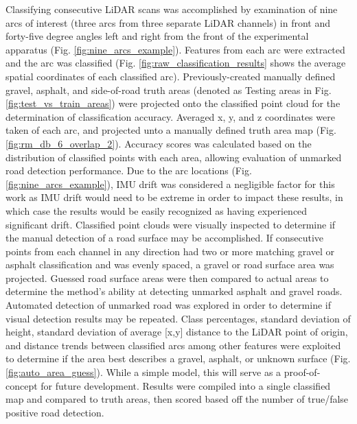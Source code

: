 \documentclass[journal,onecolumn]{IEEEtran}
\begin{document}
			{Classifying consecutive LiDAR scans was accomplished by examination of nine arcs of interest (three arcs from three separate LiDAR channels) in front and forty-five degree angles left and right from the front of the experimental apparatus (Fig. \ref{fig:nine_arcs_example}). Features from each arc were extracted and the arc was classified (Fig. \ref{fig:raw_classification_results} shows the average spatial coordinates of each classified arc). Previously-created manually defined gravel, asphalt, and side-of-road truth areas (denoted as Testing areas in Fig. \ref{fig:test_vs_train_areas}) were projected onto the classified point cloud for the determination of classification accuracy. Averaged x, y, and z coordinates were taken of each arc, and projected unto a manually defined truth area map (Fig. \ref{fig:rm_db_6_overlap_2}). Accuracy scores was calculated based on the distribution of classified points with each area, allowing evaluation of unmarked road detection performance. Due to the arc locations (Fig. \ref{fig:nine_arcs_example}), IMU drift was considered a negligible factor for this work as IMU drift would need to be extreme in order to impact these results, in which case the results would be easily recognized as having experienced significant drift. Classified point clouds were visually inspected to determine if the manual detection of a road surface may be accomplished. If consecutive points from each channel in any direction had two or more matching gravel or asphalt classification and was evenly spaced, a gravel or road surface area was projected. Guessed road surface areas were then compared to actual areas to determine the method's ability at detecting unmarked asphalt and gravel roads. Automated detection of unmarked road was explored in order to determine if visual detection results may be repeated. Class percentages, standard deviation of height, standard deviation of average [x,y] distance to the LiDAR point of origin, and distance trends between classified arcs among other features were exploited to determine if the area best describes a gravel, asphalt, or unknown surface (Fig. \ref{fig:auto_area_guess}). While a simple model, this will serve as a proof-of-concept for future development. Results were compiled into a single classified map and compared to truth areas, then scored based off the number of true/false positive road detection.  }
			
\end{document}
